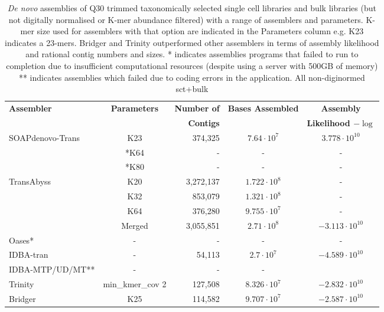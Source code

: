 \begin{table}[h]
    \begin{tabularx}{\textwidth}{|l||c|r|c|c||}
        \hline
        \textbf{Assembler} & \textbf{Parameters} & \textbf{Number of} & \textbf{Bases Assembled} & \textbf{Assembly} \\
          &   & \textbf{Contigs}										& 							& \textbf{Likelihood \(-\log\)} \\
        \hline
        \hline
        SOAPdenovo-Trans & K23 & 374,325 & \(7.64\cdot10^{7}\) & \(3.778\cdot10^{10}\) \\
                         & *K64 & - & - & - \\  
                       & *K80 & - & - & - \\ 
        \hline
        TransAbyss & K20 & 3,272,137 & \(1.722\cdot10^{8}\)   & -  \\
                   & K32 & 853,079   & \( 1.321\cdot 10^{8}\)  & -  \\
                   & K64 & 376,280   & \( 9.755\cdot 10^{7}\)  & -  \\
                   & Merged & 3,055,851 & \(2.71\cdot10^{8}\) & \(-3.113\cdot 10^{10}\)  \\
        \hline
        Oases*     & - & - & - & - \\
        \hline
        IDBA-tran      & - & 54,113 & \(2.7\cdot 10^{7}\) & \(-4.589\cdot 10^{10}\)\\
        \hline
        IDBA-MTP/UD/MT** & - & - & - & \\
        \hline
        Trinity & min\_kmer\_cov 2 & 127,508 &  \( 8.326\cdot 10^{7}\) & \(-2.832\cdot 10^{10}\) \\
        \hline
        Bridger & K25 & 114,582 & \( 9.707\cdot 10^{7}\)  & \(-2.587\cdot 10^{10}\)\\ 
        \hline
        
    \end{tabularx}
    \caption{\textit{De novo} assemblies of Q30 trimmed taxonomically
        selected single cell libraries and bulk libraries (but not digitally normalised or K-mer abundance
            filtered) with a range of assemblers and parameters.  K-mer size used
            for assemblers with that option are indicated in the Parameters column 
            e.g. K23 indicates a 23-mers. Bridger and Trinity outperformed 
            other assemblers in terms of assembly likelihood and rational
            contig numbers and sizes.
        * indicates assemblies programs that failed to run to completion due to 
        insufficient computational resources (despite using a server with 500GB 
        of memory)
        ** indicates assemblies which failed due to coding errors in the application.
        All non-diginormed sct+bulk}
        \label{tab:assemblies}
\end{table}

